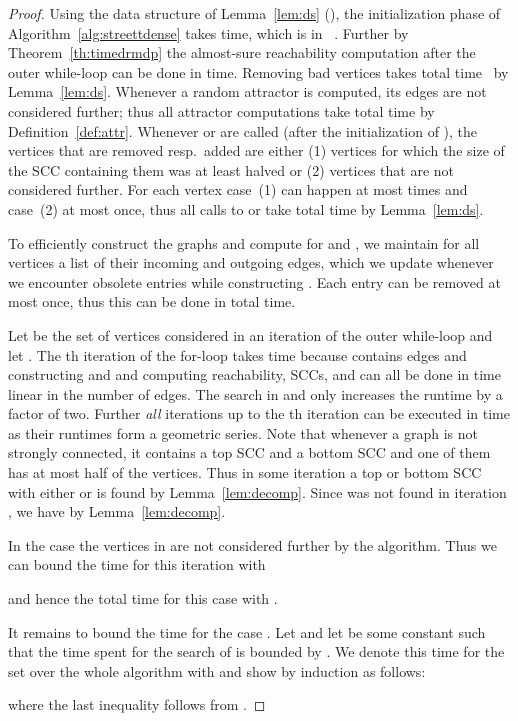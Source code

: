 \documentclass[11pt,letterpaper]{article}
\newcommand{\lu}{\textup{(}}
\newcommand{\ru}{\textup{)}\xspace}
\newcommand{\upbr}[1]{\lu #1\ru}
\begin{document}
\begin{proof}
	Using the data structure of Lemma~\ref{lem:ds} (\cite{HenzingerT96}),
	the initialization phase of Algorithm~\ref{alg:streettdense} takes 
	 time, which is in ~\cite{ChatterjeeH14}.
	Further by Theorem~\ref{th:timedrmdp} the almost-sure reachability computation
	after the outer while-loop can be done in  time. 
	Removing bad vertices takes total time~ by Lemma~\ref{lem:ds}. 
	Whenever a random attractor is computed, its edges are not considered further;
	thus all attractor computations take  total time by Definition~\ref{def:attr}.
	Whenever  or  are called (after the
	initialization of ), the vertices that are removed resp.\ added are either
	\upbr{1} vertices for which the size of the SCC containing them was at least halved
	or \upbr{2} vertices that are not considered further. For each vertex 
	case~\upbr{1} can happen at most  times and case~\upbr{2} at 
	most once, thus all calls to  or  take
	total time  by Lemma~\ref{lem:ds}.
	
	To efficiently construct the graphs  and compute 
	for  and , we maintain 
	for all vertices a list of their incoming and outgoing edges, which we 
	update whenever we encounter obsolete entries while constructing . 
	Each entry can be removed at most once, thus this can be done in  total time.
	
	Let  be the set of vertices considered in an iteration of the outer while-loop
	and let .
	The th iteration of the for-loop takes  time
	because  contains  edges and constructing  and 
	and computing reachability, SCCs, and  can all be done in time linear in the 
	number of edges. The search in  and  only increases the runtime 
	by a factor of two. Further \emph{all} iterations up to the th iteration
	can be executed in time  as their runtimes 
	form a geometric series.
	Note that whenever a graph is not strongly connected, it contains a top SCC and 
	a bottom SCC and one of them has at most half of the vertices. Thus in some
	iteration  a top or bottom SCC with either  or 
	 is found by Lemma~\ref{lem:decomp}.
	Since  was not found 
	in iteration , we have  by
	Lemma~\ref{lem:decomp}.
	
	In the case  the vertices in  are not considered further by 
	the algorithm. Thus we can bound the time for this iteration with 
	
	and hence the total time for this case with .
	
  It remains to bound the time for the case .
	Let  and let  be some constant such that 
	the time spent for the search of  is bounded by .
	We denote this time for the set  over the whole algorithm with  and 
	show  by induction as follows:
	
	where the last inequality follows from .
\end{proof}
\end{document}
